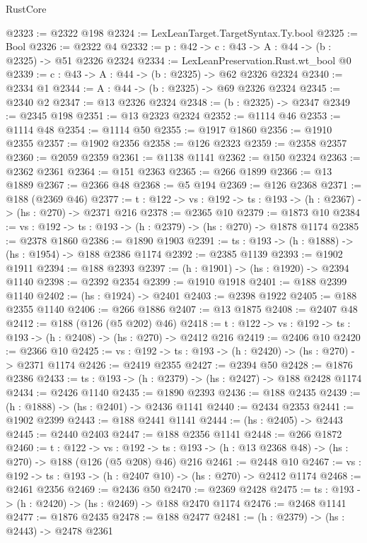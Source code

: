 \begin{lexlean}{RustCore}
\begin{coremodule}
@2323 := @2322 @198
@2324 := LexLeanTarget.TargetSyntax.Ty.bool
@2325 := Bool
@2326 := @2322 @4
@2332 := {p : @42} -> {c : @43} -> {A : @44} -> (b : @2325) -> @51 @2326 @2324
@2334 := LexLeanPreservation.Rust.wt_bool @0
@2339 := {c : @43} -> {A : @44} -> (b : @2325) -> @62 @2326 @2324
@2340 := @2334 @1
@2344 := {A : @44} -> (b : @2325) -> @69 @2326 @2324
@2345 := @2340 @2
@2347 := @13 @2326 @2324
@2348 := (b : @2325) -> @2347
@2349 := @2345 @198
@2351 := @13 @2323 @2324
@2352 := @1114 @46
@2353 := @1114 @48
@2354 := @1114 @50
@2355 := @1917 @1860
@2356 := @1910 @2355
@2357 := @1902 @2356
@2358 := @126 @2323
@2359 := @2358 @2357
@2360 := @2059 @2359
@2361 := @1138 @1141
@2362 := @150 @2324
@2363 := @2362 @2361
@2364 := @151 @2363
@2365 := @266 @1899
@2366 := @13 @1889
@2367 := @2366 @48
@2368 := @5 @194
@2369 := @126 @2368
@2371 := @188 (@2369 @46)
@2377 := {t : @122} -> {vs : @192} -> {ts : @193} -> (h : @2367) -> (hs : @270) -> @2371 @216
@2378 := @2365 @10
@2379 := @1873 @10
@2384 := {vs : @192} -> {ts : @193} -> (h : @2379) -> (hs : @270) -> @1878 @1174
@2385 := @2378 @1860
@2386 := @1890 @1903
@2391 := {ts : @193} -> (h : @1888) -> (hs : @1954) -> @188 @2386 @1174
@2392 := @2385 @1139
@2393 := @1902 @1911
@2394 := @188 @2393
@2397 := (h : @1901) -> (hs : @1920) -> @2394 @1140
@2398 := @2392 @2354
@2399 := @1910 @1918
@2401 := @188 @2399 @1140
@2402 := (hs : @1924) -> @2401
@2403 := @2398 @1922
@2405 := @188 @2355 @1140
@2406 := @266 @1886
@2407 := @13 @1875
@2408 := @2407 @48
@2412 := @188 (@126 (@5 @202) @46)
@2418 := {t : @122} -> {vs : @192} -> {ts : @193} -> (h : @2408) -> (hs : @270) -> @2412 @216
@2419 := @2406 @10
@2420 := @2366 @10
@2425 := {vs : @192} -> {ts : @193} -> (h : @2420) -> (hs : @270) -> @2371 @1174
@2426 := @2419 @2355
@2427 := @2394 @50
@2428 := @1876 @2386
@2433 := {ts : @193} -> (h : @2379) -> (hs : @2427) -> @188 @2428 @1174
@2434 := @2426 @1140
@2435 := @1890 @2393
@2436 := @188 @2435
@2439 := (h : @1888) -> (hs : @2401) -> @2436 @1141
@2440 := @2434 @2353
@2441 := @1902 @2399
@2443 := @188 @2441 @1141
@2444 := (hs : @2405) -> @2443
@2445 := @2440 @2403
@2447 := @188 @2356 @1141
@2448 := @266 @1872
@2460 := {t : @122} ->
  {vs : @192} -> {ts : @193} -> (h : @13 @2368 @48) -> (hs : @270) -> @188 (@126 (@5 @208) @46) @216
@2461 := @2448 @10
@2467 := {vs : @192} -> {ts : @193} -> (h : @2407 @10) -> (hs : @270) -> @2412 @1174
@2468 := @2461 @2356
@2469 := @2436 @50
@2470 := @2369 @2428
@2475 := {ts : @193} -> (h : @2420) -> (hs : @2469) -> @188 @2470 @1174
@2476 := @2468 @1141
@2477 := @1876 @2435
@2478 := @188 @2477
@2481 := (h : @2379) -> (hs : @2443) -> @2478 @2361

\end{coremodule}
\end{lexlean}
